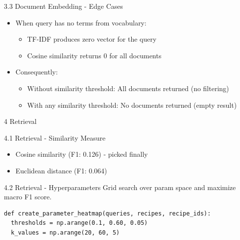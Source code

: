 \documentclass{beamer}
\begin{document}
\begin{frame}{3.3 Document Embedding - Edge Cases}
  \begin{itemize}
    \item When query has no terms from vocabulary:
          \begin{itemize}
            \item TF-IDF produces zero vector for the query
            \item Cosine similarity returns 0 for all documents
          \end{itemize}
    \item Consequently:
          \begin{itemize}
            \item Without similarity threshold: All documents returned (no filtering)
            \item With any similarity threshold: No documents returned (empty result)
          \end{itemize}
  \end{itemize}
\end{frame}

\begin{frame}{4 Retrieval}
\end{frame}

\begin{frame}{4.1 Retrieval - Similarity Measure}
  \begin{itemize}
    \item Cosine similarity (F1: 0.126) - picked finally
    \item Euclidean distance (F1: 0.064)
  \end{itemize}
\end{frame}

\begin{frame}[fragile]{4.2 Retrieval - Hyperparameters}
  Grid search over param space and maximize macro F1 score.

  \begin{verbatim}
def create_parameter_heatmap(queries, recipes, recipe_ids):
  thresholds = np.arange(0.1, 0.60, 0.05)
  k_values = np.arange(20, 60, 5)
  \end{verbatim}

\end{frame}
\end{document}
